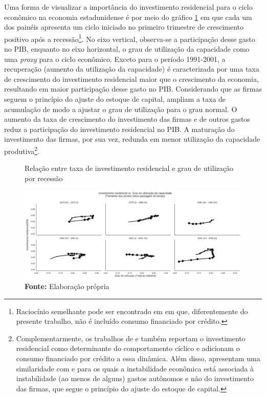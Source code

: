 Uma forma de visualizar a importância do investimento residencial para o ciclo econômico na economia estadunidense é por meio do gráfico \ref{FigIh_u} em que cada um dos painéis apresenta um ciclo iniciado no primeiro trimestre de crescimento positivo após a recessão\footnote{
	Raciocínio semelhante pode ser encontrado em \textcite{fiebiger_semi-autonomous_2018} em que, diferentemente do presente trabalho, não é incluído consumo financiado por crédito.}. 
No eixo vertical, observa-se a participação desse gasto no PIB, enquanto no eixo horizontal, o grau de utilização da capacidade como uma \textit{proxy} para o ciclo econômico. Exceto para o período 1991-2001, a recuperação (aumento da utilização da capacidade) é caracterizada por uma taxa de crescimento do investimento residencial maior que o crescimento da economia, resultando em maior participação desse gasto no PIB. Considerando que as firmas seguem o princípio do ajuste do estoque de capital, ampliam a taxa de acumulação de modo a ajustar o grau de utilização para o grau normal. O aumento da taxa de crescimento do investimento das firmas e de outros gastos reduz a participação do investimento residencial no PIB. A maturação do investimento das firmas, por sua vez, redunda em menor utilização da capacidade produtiva\footnote{
	Complementarmente, os trabalhos de \textcite{fiebiger_semi-autonomous_2018} e \textcite{fiebiger_trend_2017} também reportam o investimento residencial como determinante do comportamento cíclico e adicionam o consumo financiado por crédito a essa dinâmica. Além disso, apresentam uma similaridade com \textcite{dejuan_hidden_2017} e \textcite{teixeira_crescimento_2015} para os quais a instabilidade econômica está associada à instabilidade (ao menos de alguns) gastos autônomos e não do investimento das firmas, que segue o princípio do ajuste do estoque de capital.}. 



\begin{figure}[H]
	\centering
	\caption{Relação entre taxa de investimento residencial e grau de utilização por recessão}
	\label{FigIh_u}
	\includegraphics[width=\textwidth]{../../Dados/Fatos_Estilizados/figs/Ciclo_Ih_u.png}
	\caption*{\textbf{Fonte:} Elaboração própria}
\end{figure}

